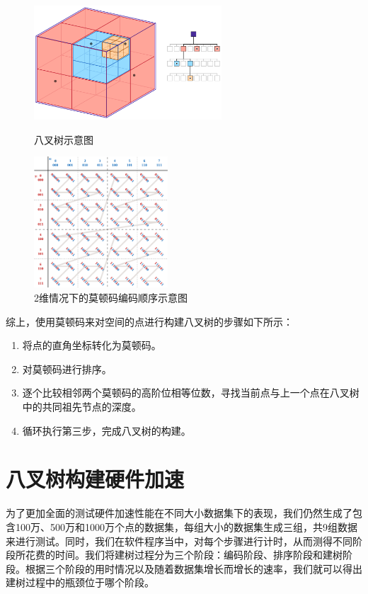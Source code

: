 \begin{figure}[htbp]
\centering
\begin{minipage}[t]{0.48\textwidth}
\centering
\includegraphics[width=7cm]{figures/octree.png}
\caption{八叉树示意图}
\label{fig:octree}
\end{minipage}
\begin{minipage}[t]{0.38\textwidth}
\centering
\includegraphics[width=5cm]{figures/Z-curve45.pdf}
\caption{2维情况下的莫顿码编码顺序示意图}
\label{fig:morton_code}
\end{minipage}
\end{figure}

综上，使用莫顿码来对空间的点进行构建八叉树的步骤如下所示：
\begin{enumerate}
    \item 将点的直角坐标转化为莫顿码。
    \item 对莫顿码进行排序。
    \item 逐个比较相邻两个莫顿码的高阶位相等位数，寻找当前点与上一个点在八叉树中的共同祖先节点的深度。
    \item 循环执行第三步，完成八叉树的构建。
\end{enumerate}



\section{八叉树构建硬件加速}

为了更加全面的测试硬件加速性能在不同大小数据集下的表现，我们仍然生成了包含100万、500万和1000万个点的数据集，每组大小的数据集生成三组，共9组数据来进行测试。同时，我们在软件程序当中，对每个步骤进行计时，从而测得不同阶段所花费的时间。我们将建树过程分为三个阶段：编码阶段、排序阶段和建树阶段。根据三个阶段的用时情况以及随着数据集增长而增长的速率，我们就可以得出建树过程中的瓶颈位于哪个阶段。

